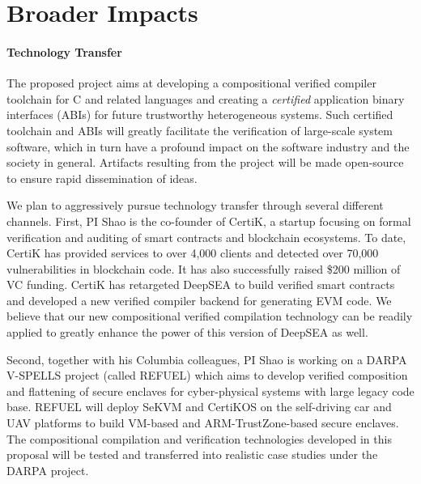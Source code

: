 \section{Broader Impacts}
\label{sec:impact}

\paragraph*{Technology Transfer}
The proposed project aims at developing a compositional verified
compiler toolchain for C and related languages and creating a {\em
  certified} application binary interfaces (ABIs) for future
trustworthy heterogeneous systems. Such certified toolchain and ABIs
will greatly facilitate the verification of large-scale system
software, which in turn have a profound impact on the software
industry and the society in general.
Artifacts resulting from the project will be
made open-source to ensure rapid dissemination of ideas.

We plan to aggressively pursue technology transfer through several
different channels. First, PI Shao is the co-founder of CertiK,
a startup focusing on formal verification and auditing of smart
contracts and blockchain ecosystems. To date,
CertiK has provided services to over 4,000 clients and detected
over 70,000 vulnerabilities in blockchain code. It has also
successfully raised \$200 million of VC funding. CertiK has retargeted
DeepSEA to build verified smart contracts and developed a new
verified compiler backend for generating EVM code. We believe
that our new compositional verified compilation technology
can be readily applied to greatly enhance the power of this version
of DeepSEA as well.

Second, together with his Columbia colleagues, PI Shao is working on
a DARPA V-SPELLS project (called REFUEL)
which aims to develop verified composition and flattening of secure
enclaves for cyber-physical systems with large legacy code base.
REFUEL will deploy SeKVM and CertiKOS on the self-driving car
and UAV platforms to build VM-based and ARM-TrustZone-based secure
enclaves. The compositional compilation and verification technologies
developed in this proposal will be tested and transferred into realistic
case studies under the DARPA project.

\vspace*{-2ex}
